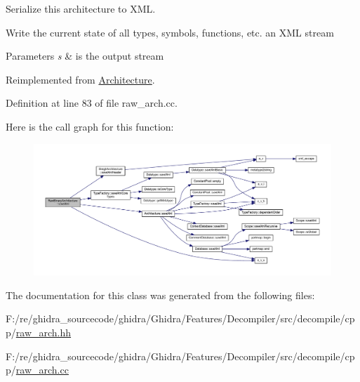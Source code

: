 Serialize this architecture to X\+ML. 

Write the current state of all types, symbols, functions, etc. an X\+ML stream 
\begin{DoxyParams}{Parameters}
{\em s} & is the output stream \\
\hline
\end{DoxyParams}


Reimplemented from \mbox{\hyperlink{class_architecture_af760a127622d4cdd4b6b436122478cb5}{Architecture}}.



Definition at line 83 of file raw\+\_\+arch.\+cc.

Here is the call graph for this function\+:
\nopagebreak
\begin{figure}[H]
\begin{center}
\leavevmode
\includegraphics[width=350pt]{class_raw_binary_architecture_a3aafb658662f5d6af564e22f5b35aafc_cgraph}
\end{center}
\end{figure}


The documentation for this class was generated from the following files\+:\begin{DoxyCompactItemize}
\item 
F\+:/re/ghidra\+\_\+sourcecode/ghidra/\+Ghidra/\+Features/\+Decompiler/src/decompile/cpp/\mbox{\hyperlink{raw__arch_8hh}{raw\+\_\+arch.\+hh}}\item 
F\+:/re/ghidra\+\_\+sourcecode/ghidra/\+Ghidra/\+Features/\+Decompiler/src/decompile/cpp/\mbox{\hyperlink{raw__arch_8cc}{raw\+\_\+arch.\+cc}}\end{DoxyCompactItemize}
